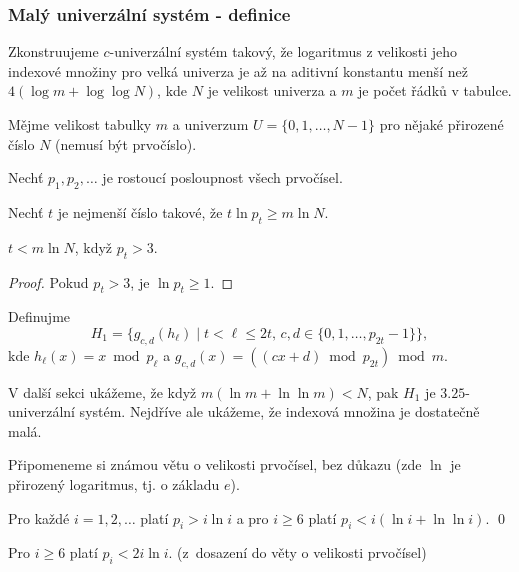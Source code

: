 \documentclass[a4paper,12pt]{article}
\begin{document}
\subsubsection{Malý univerzální systém - definice}
Zkonstruujeme $c$-univerzální systém takový, 
že logaritmus z velikosti jeho indexové množiny pro velká 
univerza je až na aditivní konstantu menší než 
$4(\log m+\log\log N)$, kde $N$ je velikost univerza a $m$ je počet 
řádků v tabulce.  

Měj\-me velikost tabulky $m$ a univerzum $U=
\{0,1,\dots,N-1\}$ pro 
nějaké přirozené číslo $N$ (nemusí být prvočíslo).

\begin{definice}
    Nechť $p_1,p_2,\dots$ je rostoucí posloupnost všech 
    prvočísel.
\end{definice}

\begin{definice} Nechť $
t$ je 
nejmenší číslo takové, že $t\ln p_t\ge m\ln N$.
\end{definice}

\begin{lemma} $t < m\ln N$, když $p_t>3$.
\end{lemma}
\begin{proof}
    Pokud $p_t>3$, je $\ln p_t \ge 1$.
\end{proof}

\begin{definice} Definujme 
$$H_1=\{g_{c,d}(h_{\ell})\mid t<\ell\le 2t,\,c,d\in \{0,1,\dots,p_{
2t}-1\}\},$$
kde $h_{\ell}(x)=x\bmod p_{\ell}$ a 
$g_{c,d}(x)=((cx+d)\bmod p_{2t})\bmod m$.
\end{definice}

V další sekci ukážeme, že když $m(\ln m+\ln\ln m)<N$, pak $H_1$ je $
3.25$-univerzální systém. Nejdříve ale ukážeme, že indexová množina je dostatečně malá. 

Připomeneme si známou větu o velikosti prvočísel, bez důkazu 
(zde $\ln$ je přirozený logaritmus, tj. o základu $e$).

\begin{veta}Pro každé $i=1,2,\dots$ platí $p_i>i\ln 
i$ a pro $i\ge 6$ 
platí $p_i<i(\ln i+\ln\ln i)$. \qed
\end{veta}

\begin{pozorovani}
Pro $i\ge 6$ platí $p_i<2i\ln i$. (z~do\-sa\-ze\-ní do věty o velikosti prvočísel)
\end{pozorovani}
\end{document}
